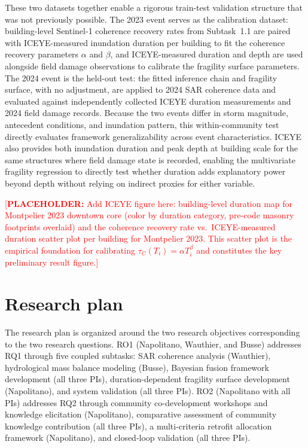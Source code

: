 \documentclass[11pt]{article}
\newcommand{\placeholder}[1]{\textcolor{red}{[\textbf{PLACEHOLDER:} #1]}}
\begin{document}
These two datasets together enable a rigorous train-test validation structure that was not
previously possible.
The 2023 event serves as the calibration dataset: building-level Sentinel-1 coherence
recovery rates from Subtask~1.1 are paired with ICEYE-measured inundation duration per
building to fit the coherence recovery parameters $\alpha$ and $\beta$,
and ICEYE-measured duration and depth are used alongside field damage observations to
calibrate the fragility surface parameters.
The 2024 event is the held-out test: the fitted inference chain and fragility surface,
with no adjustment, are applied to 2024 SAR coherence data and evaluated against
independently collected ICEYE duration measurements and 2024 field damage records.
Because the two events differ in storm magnitude, antecedent conditions, and inundation
pattern, this within-community test directly evaluates framework generalizability across
event characteristics.
ICEYE also provides both inundation duration and peak depth at building scale for the
same structures where field damage state is recorded, enabling the multivariate fragility
regression to directly test whether duration adds explanatory power beyond depth without
relying on indirect proxies for either variable.

\placeholder{Add ICEYE figure here: building-level duration map for Montpelier 2023
  downtown core (color by duration category, pre-code masonry footprints overlaid)
  and the coherence recovery rate vs.\ ICEYE-measured duration scatter plot per building
  for Montpelier 2023. This scatter plot is the empirical foundation for calibrating
  $\tau_C(T_i) = \alpha T_i^\beta$ and constitutes the key preliminary result figure.}


\section{Research plan}
The research plan is organized around the two research objectives corresponding to the two research questions.
RO1 (Napolitano, Wauthier, and Busse) addresses RQ1 through five coupled subtasks:
SAR coherence analysis (Wauthier), 
hydrological mass balance modeling (Busse),
Bayesian fusion framework development (all three PIs), duration-dependent fragility surface development (Napolitano), 
and system validation (all three PIs).
RO2 (Napolitano with all PIs) addresses RQ2 through community co-development workshops and knowledge elicitation (Napolitano), comparative assessment of community knowledge contribution (all three PIs), a multi-criteria retrofit allocation framework
(Napolitano), and closed-loop validation (all three PIs).
\end{document}

